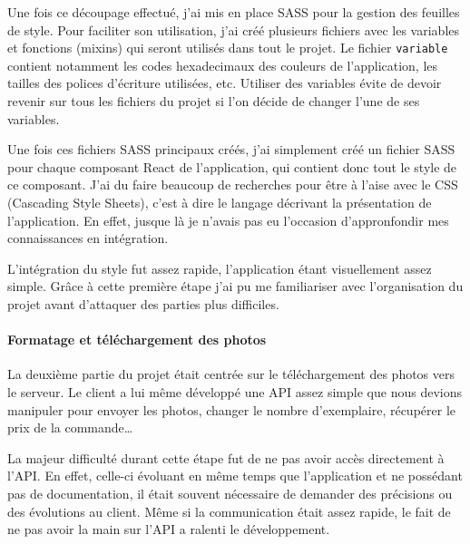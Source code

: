 \bigskip

Une fois ce découpage effectué, j'ai mis en place SASS pour la gestion
des feuilles de style. Pour faciliter son utilisation, j'ai créé
plusieurs fichiers avec les variables et fonctions (mixins) qui seront
utilisés dans tout le projet. Le fichier \texttt{variable} contient
notamment les codes hexadecimaux des couleurs de l'application, les
tailles des polices d'écriture utilisées, etc. Utiliser des variables
évite de devoir revenir sur tous les fichiers du projet si l'on décide
de changer l'une de ses variables.

\bigskip

Une fois ces fichiers SASS principaux créés, j'ai simplement créé un
fichier SASS pour chaque composant React de l'application, qui contient
donc tout le style de ce composant. J'ai du faire beaucoup de recherches
pour être à l'aise avec le CSS (Cascading Style Sheets), c'est à dire le
langage décrivant la présentation de l'application. En effet, jusque là
je n'avais pas eu l'occasion d'appronfondir mes connaissances en
intégration.

\bigskip

L'intégration du style fut assez rapide, l'application étant
visuellement assez simple. Grâce à cette première étape j'ai pu me
familiariser avec l'organisation du projet avant d'attaquer des parties
plus difficiles.

\bigskip

\paragraph{Formatage et téléchargement des
photos}\label{formatage-et-tuxe9luxe9chargement-des-photos}

\bigskip

La deuxième partie du projet était centrée sur le téléchargement des
photos vers le serveur. Le client a lui même développé une API assez
simple que nous devions manipuler pour envoyer les photos, changer le
nombre d'exemplaire, récupérer le prix de la commande\ldots{}

\bigskip

La majeur difficulté durant cette étape fut de ne pas avoir accès
directement à l'API. En effet, celle-ci évoluant en même temps que
l'application et ne possédant pas de documentation, il était souvent
nécessaire de demander des précisions ou des évolutions au client. Même
si la communication était assez rapide, le fait de ne pas avoir la main
sur l'API a ralenti le développement.

